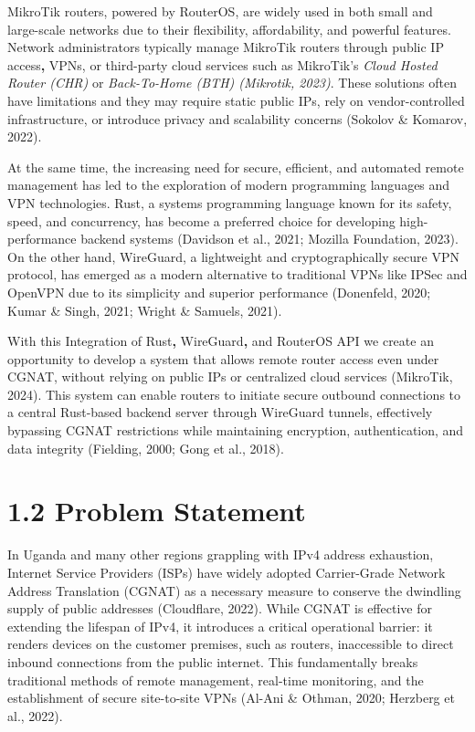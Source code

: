 \documentclass[12pt,a4paper,oneside]{report}
\begin{document}
MikroTik routers, powered by RouterOS, are widely used in both small and large-scale networks due to their flexibility, affordability, and powerful features. Network administrators typically manage MikroTik routers through public IP access\textbf{, }VPNs, or third-party cloud services such as MikroTik's \textit{Cloud Hosted Router (CHR) }or \textit{Back-To-Home (BTH) (Mikrotik, 2023)}. These solutions often have limitations and they may require static public IPs, rely on vendor-controlled infrastructure, or introduce privacy and scalability concerns (Sokolov \& Komarov, 2022).


At the same time, the increasing need for secure, efficient, and automated remote management has led to the exploration of modern programming languages and VPN technologies. Rust, a systems programming language known for its safety, speed, and concurrency, has become a preferred choice for developing high-performance backend systems (Davidson et al., 2021; Mozilla Foundation, 2023). On the other hand, WireGuard, a lightweight and cryptographically secure VPN protocol, has emerged as a modern alternative to traditional VPNs like IPSec and OpenVPN due to its simplicity and superior performance (Donenfeld, 2020; Kumar \& Singh, 2021; Wright \& Samuels, 2021).


With this Integration of Rust\textbf{, }WireGuard\textbf{, }and RouterOS API we create an opportunity to develop a system that allows remote router access even under CGNAT, without relying on public IPs or centralized cloud services (MikroTik, 2024). This system can enable routers to initiate secure outbound connections to a central Rust-based backend server through WireGuard tunnels, effectively bypassing CGNAT restrictions while maintaining encryption, authentication, and data integrity (Fielding, 2000; Gong et al., 2018).




\section{1.2 Problem Statement}

In Uganda and many other regions grappling with IPv4 address exhaustion, Internet Service Providers (ISPs) have widely adopted Carrier-Grade Network Address Translation (CGNAT) as a necessary measure to conserve the dwindling supply of public addresses (Cloudflare, 2022). While CGNAT is effective for extending the lifespan of IPv4, it introduces a critical operational barrier: it renders devices on the customer premises, such as routers, inaccessible to direct inbound connections from the public internet. This fundamentally breaks traditional methods of remote management, real-time monitoring, and the establishment of secure site-to-site VPNs (Al-Ani \& Othman, 2020; Herzberg et al., 2022).
\end{document}
